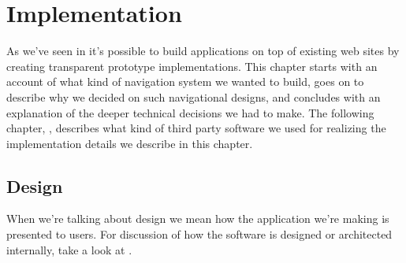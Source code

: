 \chapter{Implementation}
\label{chapter:implementation}


As we've seen in 
it's possible to build applications on top of existing web sites by creating
transparent prototype implementations. This chapter starts with an account of
what kind of navigation system we wanted to build, goes on to describe why we
decided on such navigational designs, and concludes with an explanation of the
deeper technical decisions we had to make. The following chapter,
,
describes what kind of third party software we used for realizing the
implementation details we describe in this chapter.


\section{Design}

When we're talking about design we mean how the application we're making is
presented to users. For discussion of how the software is designed
or architected internally, take a look at
.

